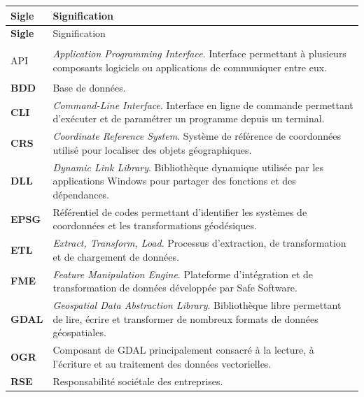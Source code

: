 \begin{longtable}{
    @{}
    >{\bfseries}p{}
    p{}
    @{}
}

\toprule
Sigle & Signification \\
\midrule
\endfirsthead

\toprule
Sigle & Signification \\
\midrule
\endhead

\bottomrule
\endlastfoot

API
&
\textit{Application Programming Interface}. Interface permettant à plusieurs
composants logiciels ou applications de communiquer entre eux.
\\

BDD
&
Base de données.
\\

CLI
&
\textit{Command-Line Interface}. Interface en ligne de commande permettant
d'exécuter et de paramétrer un programme depuis un terminal.
\\

CRS
&
\textit{Coordinate Reference System}. Système de référence de coordonnées
utilisé pour localiser des objets géographiques.
\\

DLL
&
\textit{Dynamic Link Library}. Bibliothèque dynamique utilisée par les
applications Windows pour partager des fonctions et des dépendances.
\\

EPSG
&
Référentiel de codes permettant d'identifier les systèmes de coordonnées et
les transformations géodésiques.
\\

ETL
&
\textit{Extract, Transform, Load}. Processus d'extraction, de transformation et
de chargement de données.
\\

FME
&
\textit{Feature Manipulation Engine}. Plateforme d'intégration et de
transformation de données développée par Safe Software.
\\

GDAL
&
\textit{Geospatial Data Abstraction Library}. Bibliothèque libre permettant de
lire, écrire et transformer de nombreux formats de données géospatiales.
\\

OGR
&
Composant de GDAL principalement consacré à la lecture, à l'écriture et au
traitement des données vectorielles.
\\

RSE
&
Responsabilité sociétale des entreprises.
\\


\end{longtable}
